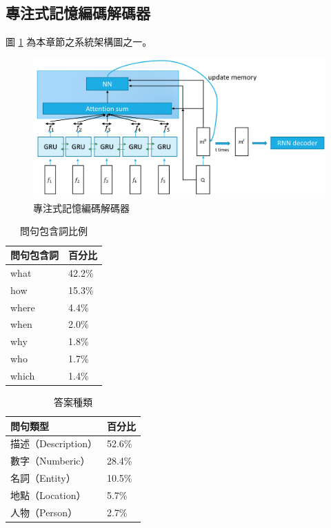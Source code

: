\subsection{專注式記憶編碼解碼器}
圖 \ref{fig:dmn} 為本章節之系統架構圖之一。
\begin{figure}
    \centering
    \includegraphics[scale=0.54]{images/chap3_dmn.png}
    \caption{專注式記憶編碼解碼器}\label{fig:dmn}
\end{figure}
\begin{table}
    \caption{問句包含詞比例}
    \label{table:query_percentage}
    \centering
    \begin{tabular}[h]{|l|l|}
        \hline
        問句包含詞  &百分比\\
        \hline
        what        &42.2\%\\
        \hline
        how         &15.3\%\\
        \hline
        where       &4.4\%\\
        \hline
        when        &2.0\%\\
        \hline
        why         &1.8\%\\
        \hline
        who         &1.7\%\\
        \hline
        which       &1.4\%\\
        \hline
    \end{tabular}
\end{table}
\begin{table}
    \caption{答案種類}
    \label{table:query_type}
    \centering
    \begin{tabular}{|l|l|}
        \hline
        問句類型            &百分比\\
        \hline
        描述（Description） &52.6\%\\
        \hline
        數字（Numberic）    &28.4\%\\
        \hline
        名詞（Entity）      &10.5\%\\
        \hline
        地點（Location）    &5.7\%\\
        \hline
        人物（Person）      &2.7\%\\
        \hline
    \end{tabular}
\end{table}

